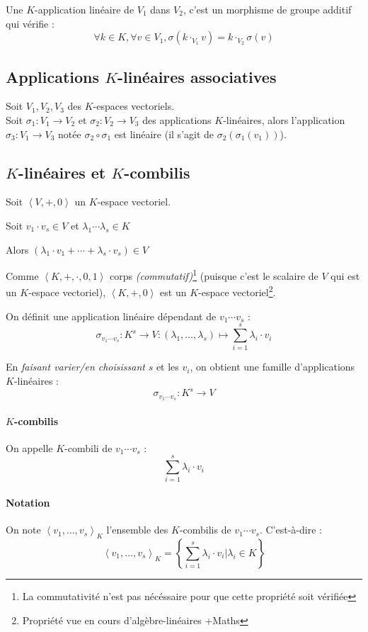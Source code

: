 \documentclass[a4paper,10pt]{article}
\newcommand{\ap}{ \rightarrow} %
\newcommand{\grp}[1]{\left\langle #1 \right\rangle} %
\newcommand{\set}[1]{\left\lbrace #1 \right\rbrace } %
\begin{document}
   Une $K$-application linéaire de $V_1$ dans $V_2$, c'est un morphisme de
   groupe additif qui vérifie : $$\forall k \in K, \forall v \in V_1,
   \sigma(k\cdot_{V_1} v) = k \cdot_{V_2} \sigma(v)$$

  \subsection{Applications $K$-linéaires associatives}
   Soit $V_1, V_2, V_3$ des $K$-espaces vectoriels.\\
   Soit $\sigma_1 : V_1 \ap V_2$ et $\sigma_2 : V_2 \ap V_3$ des applications $K$-linéaires, alors l'application $\sigma_3 : V_1 \ap V_3$ notée $\sigma_2 \circ \sigma_1$ est linéaire (il s'agit de $\sigma_2(\sigma_1(v_1))$).

  \subsection{$K$-linéaires et $K$-combilis}
   Soit $\grp{V, +, 0}$ un $K$-espace vectoriel.

   Soit $v_1 \cdot v_s \in V$ et $\lambda_1 \cdots \lambda_s \in K$

   Alors $(\lambda_1 \cdot v_1 + \cdots + \lambda_s \cdot v_s) \in V$

   Comme $\grp{K,+,\cdot, 0, 1}$ corps \textit{(commutatif)}\footnote{La commutativité n'est pas nécéssaire pour que cette propriété soit vérifiée} (puisque c'est le scalaire de $V$ qui est un $K$-espace vectoriel), $\grp{K,+,0}$ est un $K$-espace vectoriel\footnote{Propriété vue en cours d'algèbre-linéaires +Maths}.

   On définit une application linéaire dépendant de $v_1 \cdots v_s$ :
   $$\sigma_{v_1 \cdots v_s} : K^s \ap V : (\lambda_1, \hdots, \lambda_s) \mapsto \sum^{s}_{i=1} \lambda_i \cdot v_i$$

   En \textit{faisant varier/en choisissant} $s$ et les $v_i$, on obtient une famille d'applications $K$-linéaires : $$\sigma_{v_1 \cdots v_s} : K^s \ap V$$

   \paragraph{$K$-combilis} On appelle $K$-combili de $v_1 \cdots v_s$ : $$\sum^{s}_{i=1} \lambda_i \cdot v_i$$

   \paragraph{Notation} On note $\grp{v_1, \hdots, v_s}_K$ l'ensemble des $K$-combilis de $v_1 \cdots v_s$. C'est-à-dire :
   $$\grp{v_1, \hdots, v_s}_K = \set{\sum^{s}_{i=1} \lambda_i \cdot v_i | \lambda_i \in K}$$
\end{document}
